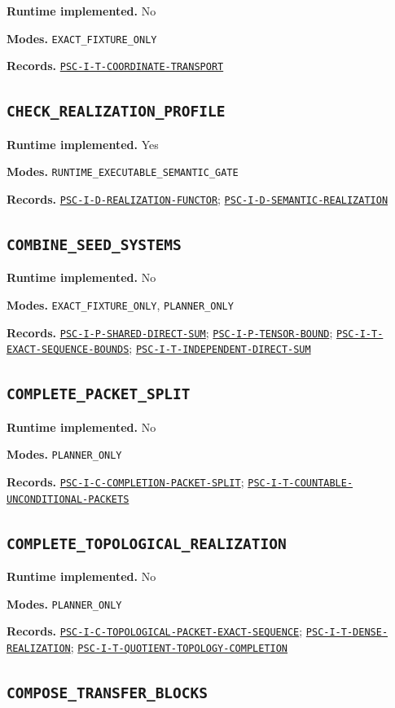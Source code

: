 \documentclass[a4paper,11pt]{article}
\newcommand{\field}[2]{\par\smallskip\noindent\textbf{#1.} #2\par}
\begin{document}
\field{Runtime implemented}{No}
\field{Modes}{\nolinkurl{EXACT_FIXTURE_ONLY}}
\field{Records}{\hyperref[rec:PSC-I-T-COORDINATE-TRANSPORT]{\nolinkurl{PSC-I-T-COORDINATE-TRANSPORT}}}
\subsection*{\nolinkurl{CHECK_REALIZATION_PROFILE}}
\field{Runtime implemented}{Yes}
\field{Modes}{\nolinkurl{RUNTIME_EXECUTABLE_SEMANTIC_GATE}}
\field{Records}{\hyperref[rec:PSC-I-D-REALIZATION-FUNCTOR]{\nolinkurl{PSC-I-D-REALIZATION-FUNCTOR}}; \hyperref[rec:PSC-I-D-SEMANTIC-REALIZATION]{\nolinkurl{PSC-I-D-SEMANTIC-REALIZATION}}}
\subsection*{\nolinkurl{COMBINE_SEED_SYSTEMS}}
\field{Runtime implemented}{No}
\field{Modes}{\nolinkurl{EXACT_FIXTURE_ONLY}, \nolinkurl{PLANNER_ONLY}}
\field{Records}{\hyperref[rec:PSC-I-P-SHARED-DIRECT-SUM]{\nolinkurl{PSC-I-P-SHARED-DIRECT-SUM}}; \hyperref[rec:PSC-I-P-TENSOR-BOUND]{\nolinkurl{PSC-I-P-TENSOR-BOUND}}; \hyperref[rec:PSC-I-T-EXACT-SEQUENCE-BOUNDS]{\nolinkurl{PSC-I-T-EXACT-SEQUENCE-BOUNDS}}; \hyperref[rec:PSC-I-T-INDEPENDENT-DIRECT-SUM]{\nolinkurl{PSC-I-T-INDEPENDENT-DIRECT-SUM}}}
\subsection*{\nolinkurl{COMPLETE_PACKET_SPLIT}}
\field{Runtime implemented}{No}
\field{Modes}{\nolinkurl{PLANNER_ONLY}}
\field{Records}{\hyperref[rec:PSC-I-C-COMPLETION-PACKET-SPLIT]{\nolinkurl{PSC-I-C-COMPLETION-PACKET-SPLIT}}; \hyperref[rec:PSC-I-T-COUNTABLE-UNCONDITIONAL-PACKETS]{\nolinkurl{PSC-I-T-COUNTABLE-UNCONDITIONAL-PACKETS}}}
\subsection*{\nolinkurl{COMPLETE_TOPOLOGICAL_REALIZATION}}
\field{Runtime implemented}{No}
\field{Modes}{\nolinkurl{PLANNER_ONLY}}
\field{Records}{\hyperref[rec:PSC-I-C-TOPOLOGICAL-PACKET-EXACT-SEQUENCE]{\nolinkurl{PSC-I-C-TOPOLOGICAL-PACKET-EXACT-SEQUENCE}}; \hyperref[rec:PSC-I-T-DENSE-REALIZATION]{\nolinkurl{PSC-I-T-DENSE-REALIZATION}}; \hyperref[rec:PSC-I-T-QUOTIENT-TOPOLOGY-COMPLETION]{\nolinkurl{PSC-I-T-QUOTIENT-TOPOLOGY-COMPLETION}}}
\subsection*{\nolinkurl{COMPOSE_TRANSFER_BLOCKS}}
\end{document}
